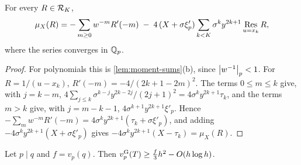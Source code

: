 \begin{lemma}\label{lem:reflection}
For every $R\in\mathcal{R}_K$,
\[
  \mu_X(R)=-\sum_{m\ge0}w^{-m}R'(-m)\;-\;4\,(X+\sigma\xi'_p)\sum_{k<K}\sigma^ky^{2k+1}
  \operatorname*{Res}_{u=x_k}R,
\]
where the series converges in $\mathbb{Q}_p$.
\end{lemma}

\begin{proof}
For polynomials this is \cref{lem:moment-sums}(b), since $\left\lvert w^{-1}\right\rvert_p<1$. For
$R=1/(u-x_k)$, $R'(-m)=-4/(2k+1-2m)^2$. The terms $0\le m\le k$ give, with $j=k-m$,
$4\sum_{j\le k}\sigma^{k-j}y^{2k-2j}/(2j+1)^2=4\sigma^ky^{2k+1}\tau_k$, and the terms $m>k$
give, with $j=m-k-1$, $4\sigma^{k+1}y^{2k+1}\xi'_p$. Hence
$-\sum_mw^{-m}R'(-m)=4\sigma^ky^{2k+1}(\tau_k+\sigma\xi'_p)$, and adding
$-4\sigma^ky^{2k+1}(X+\sigma\xi'_p)$ gives $-4\sigma^ky^{2k+1}(X-\tau_k)=\mu_X(R)$.
\end{proof}

\begin{proposition}\label{prop:p-divides-q}
Let $p\mid q$ and $f=v_p(q)$. Then $v_{p}^{\mathrm{G}}(T)\ge\frac f3h^2-O(h\log h)$.
\end{proposition}

